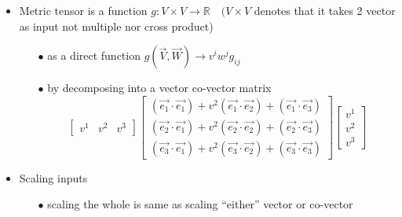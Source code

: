 \documentclass{article}
\begin{document}
	\begin{itemize}
		\item Metric tensor is a function $g:V\times V \rightarrow \mathbb{R}\quad (V\times V$ denotes that it takes 2 vector as input not multiple nor cross product)
		\begin{itemize}
			\item[$\bullet$] as a direct function $g(\overrightarrow{V}, \overrightarrow{W}) \rightarrow v^{i}w^{j}g_{ij}$
			\item[$\bullet$] by decomposing into a vector co-vector matrix
			$$\begin{bmatrix}
				v^{1} & v^{2} & v^{3}
			\end{bmatrix}\begin{bmatrix}
			(\overrightarrow{e_{1}}\cdot\overrightarrow{e_{1}}) + {v}^{2}(\overrightarrow{e_{1}}\cdot\overrightarrow{e_{2}}) + (\overrightarrow{e_{1}}\cdot\overrightarrow{e_{3}})\\
			(\overrightarrow{e_{2}}\cdot\overrightarrow{e_{1}}) + {v}^{2}(\overrightarrow{e_{2}}\cdot\overrightarrow{e_{2}}) + (\overrightarrow{e_{2}}\cdot\overrightarrow{e_{3}})\\
			(\overrightarrow{e_{3}}\cdot\overrightarrow{e_{1}}) + {v}^{2}(\overrightarrow{e_{3}}\cdot\overrightarrow{e_{2}}) + (\overrightarrow{e_{3}}\cdot\overrightarrow{e_{3}})
		\end{bmatrix}\begin{bmatrix}
		v^{1}\\
		v^{2}\\
		v^{3}
	\end{bmatrix}$$
		\end{itemize}
		\item Scaling inputs
		\begin{itemize}
			\item[$\bullet$] scaling the whole is same as scaling ``either” vector or co-vector
			

\end{itemize}
\end{itemize}
\end{document}
